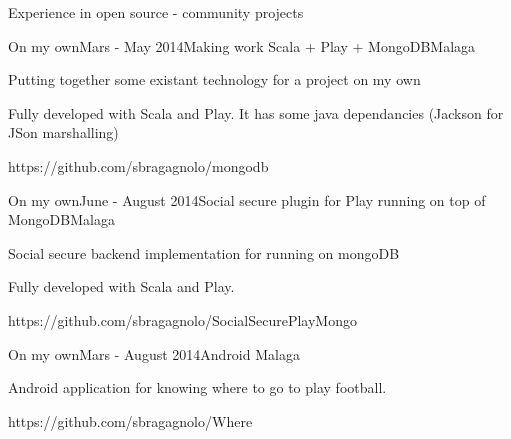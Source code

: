 \documentclass{resume} %
\begin{document}
\begin{rSection}{Experience in open source - community projects}

\begin{rSubsection}{On my own}{Mars - May 2014}{Making work Scala + Play + MongoDB}{Malaga}
	\item Putting together some existant technology for a project on my own
	\item Fully developed with Scala and Play. It has some java dependancies (Jackson for JSon marshalling)
	\item https://github.com/sbragagnolo/mongodb
\end{rSubsection}

\begin{rSubsection}{On my own}{June - August 2014}{Social secure plugin for Play running on top of MongoDB}{Malaga}
	\item Social secure backend implementation for running on mongoDB
	\item Fully developed with Scala and Play. 
	\item https://github.com/sbragagnolo/SocialSecurePlayMongo
\end{rSubsection}

\begin{rSubsection}{On my own}{Mars - August 2014}{Android }{Malaga}
	\item Android application for knowing where to go to play football.
	\item https://github.com/sbragagnolo/Where
\end{rSubsection}



\end{rSection}
\end{document}

